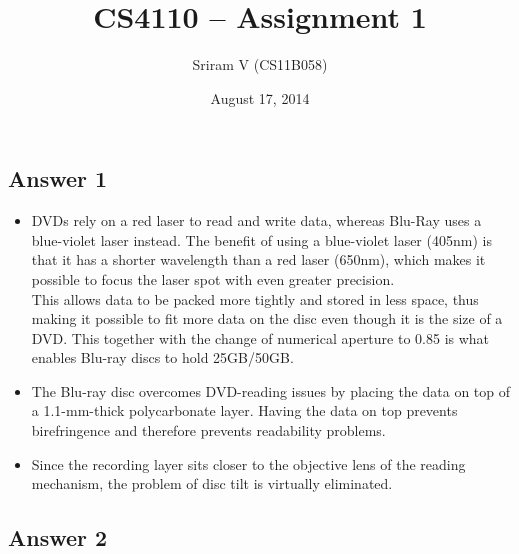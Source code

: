 \documentclass[]{article}
\title{CS4110 -- Assignment 1}
\author{Sriram V (CS11B058)}
\date{August 17, 2014}
\begin{document}
\maketitle

\subsection{Answer 1}\label{answer-1}

\begin{itemize}
\itemsep1pt\parskip0pt
\item
  DVDs rely on a red laser to read and write data, whereas Blu-Ray uses
  a blue-violet laser instead. The benefit of using a blue-violet laser
  (405nm) is that it has a shorter wavelength than a red laser (650nm),
  which makes it possible to focus the laser spot with even greater
  precision.\\This allows data to be packed more tightly and stored in
  less space, thus making it possible to fit more data on the disc even
  though it is the size of a DVD. This together with the change of
  numerical aperture to 0.85 is what enables Blu-ray discs to hold
  25GB/50GB.
\item
  The Blu-ray disc overcomes DVD-reading issues by placing the data on
  top of a 1.1-mm-thick polycarbonate layer. Having the data on top
  prevents birefringence and therefore prevents readability problems.
\item
  Since the recording layer sits closer to the objective lens of the
  reading mechanism, the problem of disc tilt is virtually eliminated.
\end{itemize}

\subsection{Answer 2}\label{answer-2}
\end{document}
